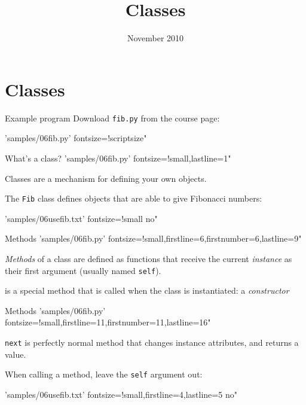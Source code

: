 \documentclass{pyslides}
\title{Classes}
\date{November 2010}
\begin{document}
\begin{frame}\titlepage\end{frame}

\section{Classes}

\begin{frame}[fragile]{Example program}
Download \texttt{fib.py} from the course page:
\bigskip

 'samples/06fib.py' fontsize=!scriptsize"
\end{frame}

\begin{frame}[fragile]{What's a class?}
 'samples/06fib.py' fontsize=!small,lastline=1"

Classes are a mechanism for defining your own objects.

The \texttt{Fib} class defines objects that are able to give Fibonacci numbers:

 'samples/06usefib.txt' fontsize=!small no"
\end{frame}

\begin{frame}[fragile]{Methods}
 'samples/06fib.py' fontsize=!small,firstline=6,firstnumber=6,lastline=9"

\emph{Methods} of a class are defined as functions that receive the current \emph{instance} as their first argument (usually named \texttt{self}).

\bigskip

\texttt{} is a special method that is called when the class is instantiated: a \emph{constructor}

\end{frame}

\begin{frame}[fragile]{Methods}
 'samples/06fib.py' fontsize=!small,firstline=11,firstnumber=11,lastline=16"

\texttt{next} is perfectly normal method that changes instance attributes, and returns a value.

\bigskip

When calling a method, leave the \texttt{self} argument out:

 'samples/06usefib.txt' fontsize=!small,firstline=4,lastline=5 no"

\end{frame}
\end{document}
